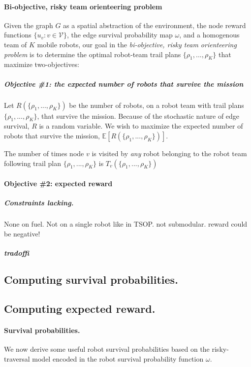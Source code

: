 \documentclass[11pt, oneside]{article}
\begin{document}
\paragraph{Bi-objective, risky team orienteering problem}
Given the graph $G$ as a spatial abstraction of the environment, the node reward functions $\{u_v : v \in\mathcal{V}\}$, the edge survival probability map $\omega$, and a homogenous team of $K$ mobile robots, our goal in the \emph{bi-objective, risky team orienteering problem} is to determine the optimal robot-team trail plans $\{\rho_1, ..., \rho_K\}$ that maximize two-objectives:

\vspace{-\baselineskip}
\subparagraph{Objective \#1: the expected number of robots that survive the mission}
Let $R(\{\rho_1, ..., \rho_K\})$ be the number of robots, on a robot team with trail plans $\{\rho_1, ..., \rho_K\}$, that survive the mission. Because of the stochastic nature of edge survival, $R$ is a random variable. We wish to maximize the expected number of robots that survive the mission, $\mathbb{E}[R(\{\rho_1, ..., \rho_K\})]$.

The number of times node $v$ is visited by \emph{any} robot belonging to the robot team following trail plan $\{\rho_1, ..., \rho_K\}$ is $T_v(\{\rho_1, ..., \rho_K\} ) $
	
\vspace{-\baselineskip}
\paragraph{Objective \#2: expected reward}

\subparagraph{Constraints lacking.} None on fuel. Not on a single robot like in TSOP. not submodular. reward could be negative!

\subparagraph{tradoffi}

\subsection{Computing survival probabilities.}

\subsection{Computing expected reward.}
\paragraph{Survival probabilities.} 
We now derive some useful robot survival probabilities based on the risky-traversal model encoded in the robot survival probability function $\omega$.
\end{document}
